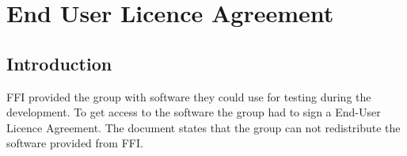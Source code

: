 \chapter{End User Licence Agreement}
\label{appendix-eula}

\section{Introduction}

FFI provided the group with software they could use for testing during the development. To get access to the software the group had to sign a End-User Licence Agreement. The document states that the group can not redistribute the software provided from FFI.


